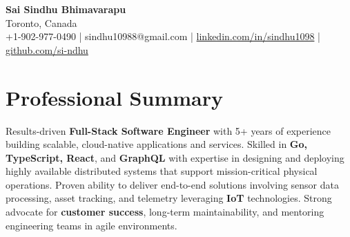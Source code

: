 \documentclass[letterpaper,11pt]{article}
\begin{document}
\begin{center}
  {\Large \textbf{Sai Sindhu Bhimavarapu}} \\
  Toronto, Canada \\
  +1-902-977-0490 \enspace | \enspace sindhu10988@gmail.com \enspace | \enspace \href{https://www.linkedin.com/in/sindhu1098/}{linkedin.com/in/sindhu1098} \enspace | \enspace \href{https://github.com/si-ndhu}{github.com/si-ndhu}
\end{center}

\section{Professional Summary}
  \begin{itemize}[leftmargin=0.15in, label={}]
    \small{\item{
     Results-driven \textbf{Full-Stack Software Engineer} with 5+ years of experience building scalable, cloud-native applications and services. Skilled in \textbf{Go, TypeScript, React}, and \textbf{GraphQL} with expertise in designing and deploying highly available distributed systems that support mission-critical physical operations. Proven ability to deliver end-to-end solutions involving sensor data processing, asset tracking, and telemetry leveraging \textbf{IoT} technologies. Strong advocate for \textbf{customer success}, long-term maintainability, and mentoring engineering teams in agile environments.
    }}
  \end{itemize}
\vspace{-16pt}

\end{document}
